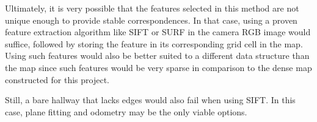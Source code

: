 \documentclass[letterpaper]{article}%
\begin{document}
Ultimately, it is very possible that the features selected in this method are
not unique enough to provide stable correspondences. In that case, using a
proven feature extraction algorithm like SIFT or SURF in the camera RGB image
would suffice, followed by storing the feature in its corresponding grid cell
in the map. Using such features would also be better suited to a different
data structure than the map since such features would be very sparse in
comparison to the dense map constructed for this project.

Still, a bare hallway that lacks edges would also fail when using SIFT. In this
case, plane fitting and odometry may be the only viable options.

\end{document}
